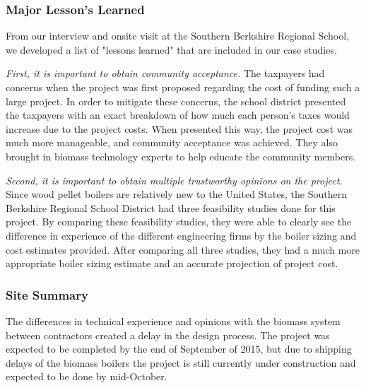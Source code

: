 \subsubsection{Major Lesson’s Learned}
\par From our interview and onsite visit at the Southern Berkshire Regional School, we developed a list of "lessons learned" that are included in our case studies.
\par \emph{First, it is important to obtain community acceptance.} The taxpayers had concerns when the project was first proposed regarding the cost of funding such a large project. In order to mitigate these concerns, the school district presented the taxpayers with an exact breakdown of how much each person’s taxes would increase due to the project costs. When presented this way, the project cost was much more manageable, and community acceptance was achieved. They also brought in biomass technology experts to help educate the community members.

\par \emph{Second, it is important to obtain multiple trustworthy opinions on the project.} Since wood pellet boilers are relatively new to the United States, the Southern Berkshire Regional School District had three feasibility studies done for this project. By comparing these feasibility studies, they were able to clearly see the difference in experience of the different engineering firms by the boiler sizing and cost estimates provided. After comparing all three studies, they had a much more appropriate boiler sizing estimate and an accurate projection of project cost. 

\subsubsection{Site Summary}
\par The differences in technical experience and opinions with the biomass system between contractors created a delay in the design process. The project was expected to be completed by the end of September of 2015, but due to shipping delays of the biomass boilers the project is still currently under construction and expected to be done by mid-October.

